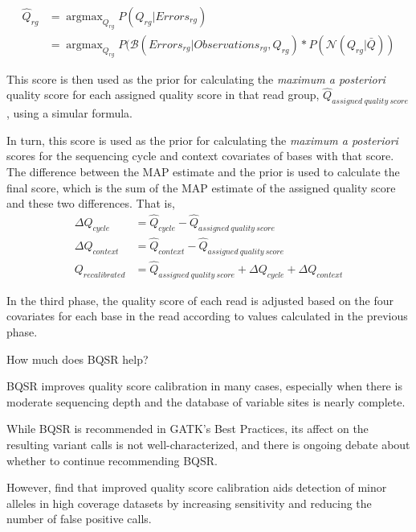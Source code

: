 \documentclass{article}
\begin{document}
\begin{outline}
\begin{outline}
		\begin{align}
		\hat{Q}_{rg} &= \operatorname{argmax}_{Q_{rg}} P(Q_{rg}|Errors_{rg}) \\
		&= \operatorname{argmax}_{Q_{rg}} P(\mathcal{B}(Errors_{rg} | Observations_{rg}, Q_{rg}) * P(\mathcal{N}(Q_{rg} | \bar{Q}))
		\end{align}
		\item This score is then used as the prior for calculating the \textit{maximum a posteriori} quality score for each assigned quality score in that read group, $\hat{Q}_{assigned\:quality\:score}$, using a simular formula.
		\item In turn, this score is used as the prior for calculating the \textit{maximum a posteriori} scores for the sequencing cycle and context covariates of bases with that score. The difference between the MAP estimate and the prior is used to calculate the final score, which is the sum of the MAP estimate of the assigned quality score and these two differences. That is,
		\begin{align}
		\Delta Q_{cycle} &= \hat{Q}_{cycle} - \hat{Q}_{assigned\:quality\:score} \\
		\Delta Q_{context} &= \hat{Q}_{context} - \hat{Q}_{assigned\:quality\:score} \\
		Q_{recalibrated} &= \hat{Q}_{assigned\:quality\:score} + \Delta Q_{cycle} + \Delta Q_{context}
		\end{align}
		\item In the third phase, the quality score of each read is adjusted based on the four covariates for each base in the read according to values calculated in the previous phase.
	\end{outline}
	\item How much does BQSR help?
	\begin{outline}
		\item BQSR improves quality score calibration in many cases, especially when there is moderate sequencing depth and the database of variable sites is nearly complete. %
		\item While BQSR is recommended in GATK's Best Practices, its affect on the resulting variant calls is not well-characterized, and there is ongoing debate about whether to continue recommending BQSR. \parencite{van_der_auwera_geraldine_2020} %
		\item However, \cite{ni_improvement_2016} find that improved quality score calibration aids detection of minor alleles in high coverage datasets by increasing sensitivity and reducing the number of false positive calls.

\end{outline}
\end{outline}
\end{document}
